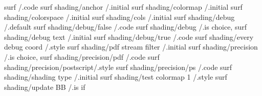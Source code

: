 surf                             /.code
surf shading/anchor              /.initial
surf shading/colormap            /.initial
surf shading/colorspace          /.initial
surf shading/cols                /.initial
surf shading/debug               /.default
surf shading/debug/false         /.code
surf shading/debug               /.is choice,
surf shading/debug text          /.initial
surf shading/debug/true          /.code
surf shading/every debug coord   /.style
surf shading/pdf stream filter   /.initial
surf shading/precision           /.is choice,
surf shading/precision/pdf       /.code
surf shading/precision/postscript/.style
surf shading/precision/ps        /.code
surf shading/shading type        /.initial
surf shading/test colormap 1     /.style
surf shading/update BB           /.is if

